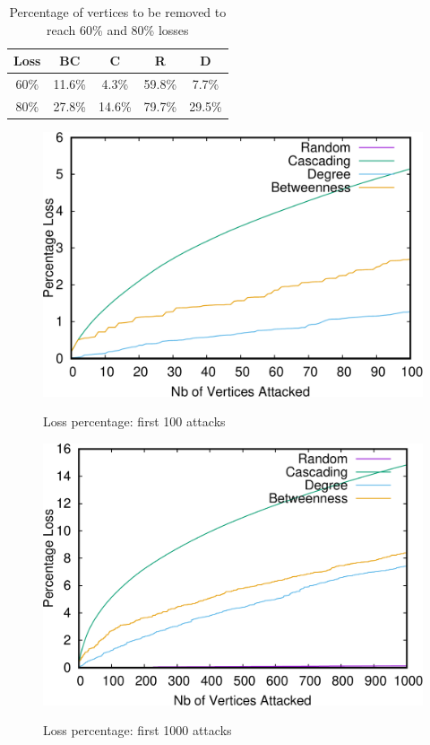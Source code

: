 \begin{table}[t]
\begin{minipage}[b]{\textwidth}
\label{tab:threshold-percentage}
\caption{Percentage of vertices to be removed to reach 60\% and 80\% losses}
{\small
\begin{tabular}{||c||c|c|c|c||}
\hline
\textbf{Loss}	&\cellcolor{black!10}BC&	\cellcolor{black!10}C & \cellcolor{black!10} R & \cellcolor{black!10} D \\ \hline \hline
60\% &		11.6\%&	4.3\%	&59.8\%&	7.7\%	 \\ \hline		
80\%	&		27.8\%&	14.6\%	&79.7\%&	29.5\%	 \\ \hline		
\end{tabular}
}
\end{minipage}
\end{table}




\begin{figure}
\centering
\includegraphics[scale=0.35]{bench/loss-100-crop.pdf}
\label{fig:loss-100}
\caption{Loss percentage: first 100 attacks}
\end{figure}

\begin{figure}
\centering
\includegraphics[scale=0.35]{bench/loss-1000-crop.pdf}
\label{fig:loss-1000}
\caption{Loss percentage: first 1000 attacks}
\end{figure}

